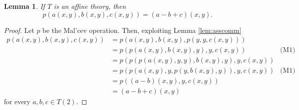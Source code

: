 \documentclass{amsart}
\numberwithin{equation}{section}
\theoremstyle{plain}
\newtheorem{lemma}[theorem]{Lemma}
\theoremstyle{definition}
\begin{document}
\begin{lemma}
  \label{lem:pl}
  If $T$ is an affine theory, then 
  \begin{equation*}
    p(a(x,y), b(x,y), c(x,y))=(a-b+c)(x,y)\text{.}
  \end{equation*}
\end{lemma}
\begin{proof}
  Let $p$ be the Mal'cev operation. Then, exploiting Lemma \ref{lem:asscomm}
  \begin{align*}
    p(a(x,y),b(x,y),c(x,y)) & = p(a(x,y),b(x,y),p(y,y,c(x,y))) & \\
    & = p(p(a(x,y),b(x,y),y),y,c(x,y)) & \text{(M1)} \\
    & = p(p(p(a(x,y),y,y),b(x,y),y),y,c(x,y)) & \\
    & = p(p(a(x,y),y,p(y,b(x,y),y)),y,c(x,y)) & \text{(M1)}\\
    & = p((a-b)(x,y),y,c(x,y)) & \\
    & = (a-b+c)(x,y) & 
  \end{align*}
  for every $a,b,c \in T(2)$. 
\end{proof}

\end{document}
